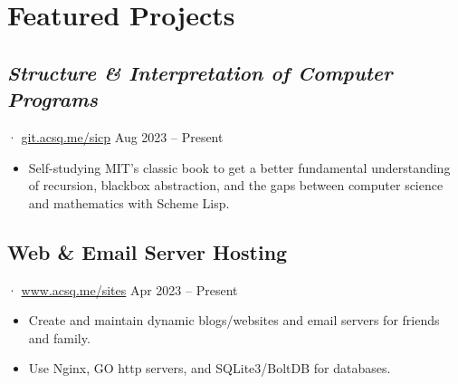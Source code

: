 \documentclass[12pt]{article}
\newcommand{\itemspace}{\vspace{0.1870em}}
\renewcommand{\textsc}[1]{\uppercase{\footnotesize#1}\normalsize}
\begin{document}
\itemspace

\section{Featured Projects}

\subsection{\textit{Structure \& Interpretation of Computer Programs}} ·
\href{https://git.acsq.me/sicp/about/}{git.acsq.me/sicp}
\hfill Aug 2023 -- Present

\begin{itemize}[noitemsep,nolistsep]
  \item Self-studying MIT's classic book to get a better fundamental
    understanding of recursion, blackbox abstraction, and the gaps between computer
    science and mathematics with Scheme Lisp.
\end{itemize}

\itemspace

\subsection{Web \& Email Server Hosting} ·
\href{https://www.acsq.me/sites}{www.acsq.me/sites}
\hfill Apr 2023 -- Present

\begin{itemize}[noitemsep,nolistsep]
  \item Create and maintain dynamic blogs/websites and email servers for
    friends and family.

  \item Use Nginx, \textsc{go} http servers, and SQLite3/BoltDB for databases.
\end{itemize}

\itemspace

\end{document}
